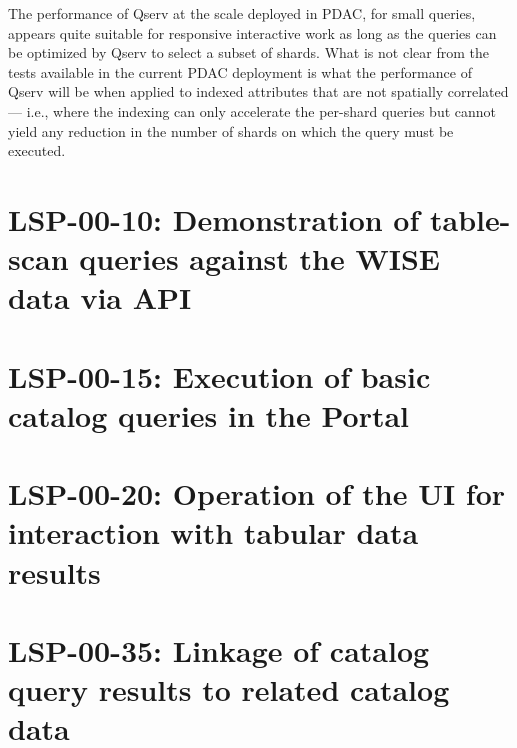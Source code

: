 \documentclass[DM,lsstdraft,STR,toc]{lsstdoc}
\begin{document}
The performance of Qserv at the scale deployed in PDAC, for small queries,
appears quite suitable for responsive interactive work as long as the queries can be optimized by Qserv to select a subset of shards.
What is not clear from the tests available in the current PDAC deployment is what the performance of Qserv will be when applied to indexed attributes that are not spatially correlated ---
i.e., where the indexing can only accelerate the per-shard queries but cannot yield any reduction in the number of shards on which the query must be executed.


\section{LSP-00-10: Demonstration of table-scan queries against the WISE data via API}
\label{sect:lsp-00-10}

\section{LSP-00-15: Execution of basic catalog queries in the Portal}
\label{sect:lsp-00-15}

\section{LSP-00-20: Operation of the UI for interaction with tabular data results}
\label{sect:lsp-00-20}

\section{LSP-00-35: Linkage of catalog query results to related catalog data}
\label{sect:lsp-00-35}
\end{document}
